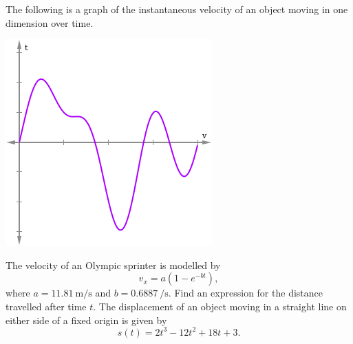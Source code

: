 \begin{questions}
  \questioM The following is a graph of the instantaneous velocity of an object moving in one dimension over time.
            \begin{center}
              \includegraphics[width=0.3\linewidth]{velocity2}
            \end{center}
  \questioM The velocity of an Olympic sprinter is modelled by
            \begin{displaymath}
              v_x = a(1 - e^{-bt}),
            \end{displaymath}
            where $ a = \SI{11.81}{\metre\per\second} $ and $ b = \SI{0.6887}{\per\second} $. Find an expression for the
            distance travelled after time $ t $.
  \questioE The displacement of an object moving in a straight line on either side of a fixed origin is given by
            \begin{displaymath}
              s(t) = 2t^3 - 12t^2 + 18t + 3.
            \end{displaymath}
\end{questions}
